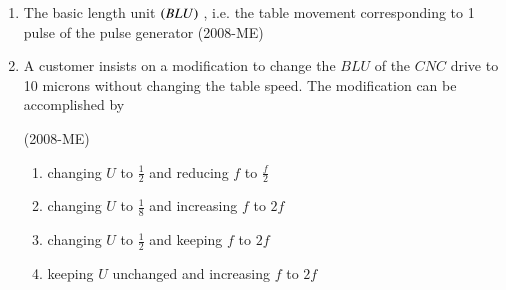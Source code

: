 \documentclass[journal]{IEEEtran}
\begin{document}
\begin{enumerate}
 
 \item The basic length unit $\left(BLU\right)$
, i.e. the table movement corresponding to 1
 pulse of the pulse generator \label{84} \hfill(2008-ME)
 \begin{enumerate}
 \end{enumerate}
 \item A customer insists on a modification to change the $BLU$
 of the $CNC$
 drive to 10 microns without changing the table speed. The modification can be accomplished by \label{85} 

 \hfill(2008-ME)
 \begin{enumerate}
     \item changing $U$ to $\frac{1}{2}$ and reducing $f$ to $\frac{f}{2}$
     \item changing $U$ to $\frac{1}{8}$ and increasing $f$ to $2f$
     \item changing $U$ to $\frac{1}{2}$ and keeping $f$ to $2f$
     \item keeping  $U$ unchanged and increasing $f$ to $2f$
 \end{enumerate}
\end{enumerate}
\end{document}
